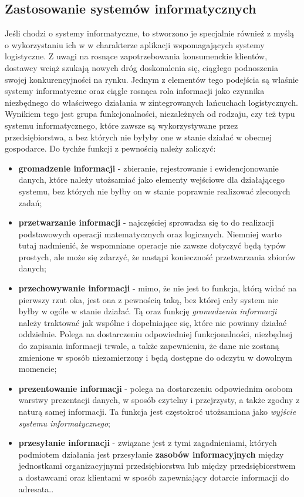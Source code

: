 	\subsection{Zastosowanie systemów informatycznych}
		Jeśli chodzi o systemy informatyczne, to stworzono je specjalnie również z myślą o wykorzystaniu ich w 
		w charakterze aplikacji wspomagających systemy logistyczne. Z uwagi na rosnące zapotrzebowania
		konsumenckie klientów, dostawcy wciąż szukają nowych dróg doskonalenia się, ciągłego podnoszenia
		swojej konkurencyjności na rynku. Jednym z elementów tego podejścia są właśnie systemy informatyczne 
		oraz ciągle rosnąca rola informacji jako czynnika niezbędnego do właściwego działania w 
		zintegrowanych łańcuchach logistycznych. Wynikiem tego jest grupa funkcjonalności, niezależnych od
		rodzaju, czy też typu systemu informatycznego, które zawsze są wykorzystywane przez przedsiębiorstwa,
		a bez których nie byłyby one w stanie działać w obecnej gospodarce.	
		Do tychże funkcji z pewnością należy zaliczyć:
		\begin{itemize}
			\item \textbf{gromadzenie informacji} - 
				zbieranie, rejestrowanie i ewidencjonowanie danych, które należy utożsamiać jako elementy wejściowe
				dla działającego systemu, bez których nie byłby on w stanie poprawnie realizować zleconych zadań;
			\item \textbf{przetwarzanie informacji} - 
				najczęściej sprowadza się to do realizacji podstawowych operacji
				matematycznych oraz logicznych. Niemniej warto tutaj nadmienić, że wspomniane operacje nie zawsze dotyczyć będą
				typów prostych, ale może się zdarzyć, że nastąpi konieczność przetwarzania zbiorów danych;
			\item \textbf{przechowywanie informacji} - 
				mimo, że nie jest to funkcja, którą widać na pierwszy rzut oka, jest ona z pewnością taką, bez której cały
				system nie byłby w ogóle w stanie działać. Tą oraz funkcję \emph{gromadzenia informacji} należy traktować jak wspólne
				i dopełniające się, które nie powinny działać oddzielnie. Polega na dostarczeniu odpowiedniej funkcjonalności, 
				niezbędnej do zapisania informacji trwale, a także zapewnieniu, że dane nie zostaną zmienione w sposób
				niezamierzony i będą dostępne do odczytu w dowolnym momencie;
			\item \textbf{prezentowanie informacji} - 
				polega na dostarczeniu odpowiednim osobom warstwy prezentacji danych, w sposób czytelny i przejrzysty, a także zgodny
				z naturą samej informacji. Ta funkcja jest częstokroć utożsamiana jako \emph{wyjście systemu informatycznego};
			\item \textbf{przesyłanie informacji} - 
				związane jest z tymi zagadnieniami, których podmiotem działania jest przesyłanie \textbf{zasobów informacyjnych}
				między jednostkami organizacyjnymi przedsiębiorstwa lub między przedsiębiorstwem a dostawcami oraz klientami w sposób
				zapewniający dotarcie informacji do adresata.\cite{logistyka_w_przedsiebiorstwie}.
		\end{itemize}
